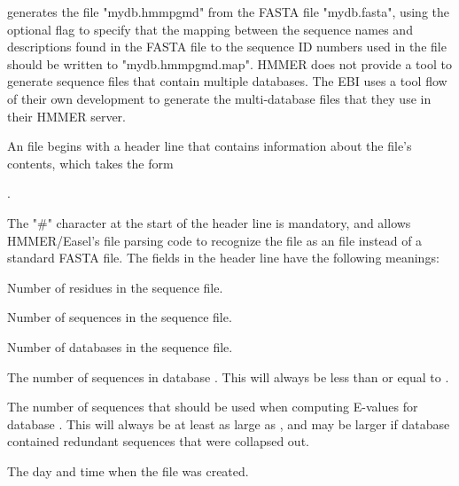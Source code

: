 \documentclass[notoc,justified]{tufte-book}    %
\begin{document}

generates the  file "mydb.hmmpgmd" from the FASTA file "mydb.fasta", using the optional  flag to specify that the mapping between the sequence names and descriptions found in the FASTA file to the sequence ID numbers used in the  file should be written to "mydb.hmmpgmd.map".  HMMER does not provide a tool to generate sequence files that contain multiple databases.  The EBI uses a tool flow of their own development to generate the multi-database files that they use in their HMMER server.
 

An  file begins with a header line that contains information about the file's contents, which takes the form 

.

The "\#" character at the start of the header line is mandatory, and allows HMMER/Easel's file parsing code to recognize the file as an  file instead of a standard FASTA file.  The fields in the header line have the following meanings:

\begin{sreitems}{}

\item [\monob{res\_cnt}] Number of residues in the sequence file.

\item [\monob{seq\_cnt}] Number of sequences in the sequence file. 

\item [\monob{db\_cnt}] Number of databases in the sequence file. 

\item [\monob{cnt\_i}] The number of sequences in database . This will always be less than or equal to .
 
\item [\monob{fullcnt\_i}] The number of sequences that should be used when computing E-values for database .  This will always be at least as large as , and may be larger if database  contained redundant sequences that were collapsed out.

\item [\monob{date\_stamp}] The day and time when the file was created.
\end{sreitems}
\end{document}
